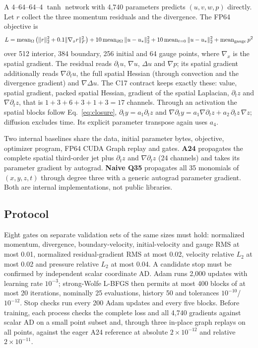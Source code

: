 \documentclass[11pt]{article}
\begin{document}
A 4--64--64--4 $\tanh$ network with 4,740 parameters predicts
$(u,v,w,p)$ directly. Let $r$ collect the three momentum residuals and the
divergence. The FP64 objective is
\begin{equation}
L=\operatorname{mean}_{\Omega}\left(\|r\|_2^2+0.1\|\nabla_x r\|_F^2\right)
+10\operatorname{mean}_{\partial\Omega}\|u-u_*\|_2^2
+10\operatorname{mean}_{t=0}\|u-u_*\|_2^2
+\operatorname{mean}_{\rm gauge}p^2
\end{equation}
over 512 interior, 384 boundary, 256 initial and 64 gauge points, where
$\nabla_x$ is the spatial gradient. The residual reads $\partial_t u$,
$\nabla u$, $\Delta u$ and $\nabla p$; its spatial gradient additionally
reads $\nabla\partial_t u$, the full spatial Hessian (through convection and
the divergence gradient) and $\nabla\Delta u$. The C17 contract keeps
exactly these: value, spatial gradient, packed spatial Hessian, gradient of
the spatial Laplacian, $\partial_t z$ and $\nabla\partial_t z$, that is
$1+3+6+3+1+3=17$ channels. Through an activation the spatial blocks follow
Eq.~\eqref{eq:closure}, $\partial_t y=a_1\partial_t z$ and
$\nabla\partial_t y=a_1\nabla\partial_t z+a_2\,\partial_t z\,\nabla z$; diffusion
excludes time. Its explicit parameter transpose again uses $a_4$.

Two internal baselines share the data, initial parameter bytes, objective,
optimizer program, FP64 CUDA Graph replay and gates. \textbf{A24} propagates
the complete spatial third-order jet plus $\partial_t z$ and
$\nabla\partial_t z$ (24 channels) and takes its parameter gradient by
autograd. \textbf{Naive Q35} propagates all 35 monomials of $(x,y,z,t)$
through degree three with a generic autograd parameter gradient. Both are
internal implementations, not public libraries.

\subsection{Protocol}
Eight gates on separate validation sets of the same sizes must hold:
normalized momentum, divergence, boundary-velocity, initial-velocity and
gauge RMS at most 0.01, normalized residual-gradient RMS at most 0.02,
velocity relative $L_2$ at most 0.02 and pressure relative $L_2$ at most
0.04. A candidate stop must be confirmed by independent scalar coordinate
AD. Adam runs 2,000 updates with learning rate $10^{-3}$; strong-Wolfe
L-BFGS then permits at most 400 blocks of at most 20 iterations, nominally
25 evaluations, history 50 and tolerances $10^{-10}$/$10^{-12}$. Stop checks
run every 200 Adam updates and every five blocks. Before training, each
process checks the complete loss and all 4,740 gradients against scalar AD
on a small point subset and, through three in-place graph replays on all
points, against the eager A24 reference at
absolute $2\times10^{-12}$ and relative $2\times10^{-11}$.
\end{document}
